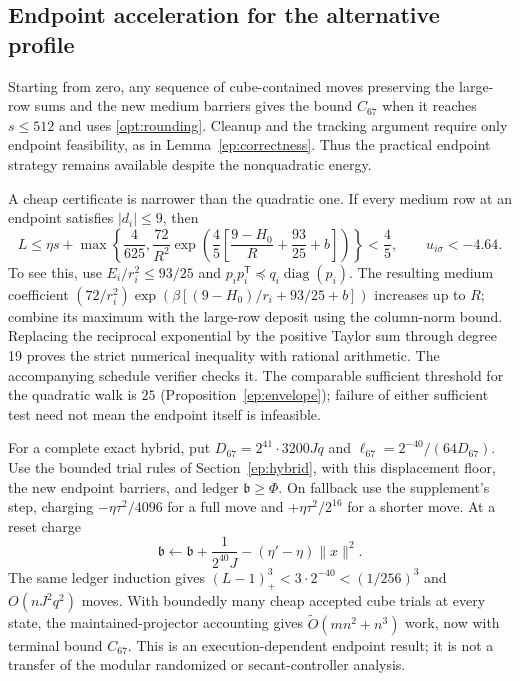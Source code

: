 \documentclass[11pt]{amsart}
\theoremstyle{definition}\newtheorem{definition}[theorem]{Definition}
\theoremstyle{remark}\newtheorem{remark}[theorem]{Remark}
\numberwithin{equation}{section}
\newcommand{\diag}{\operatorname{diag}}
\newcommand{\T}{\mathsf T}
\begin{document}
\subsection{Endpoint acceleration for the alternative profile}
Starting from zero, any sequence of cube-contained moves preserving the
large-row sums and the new medium barriers gives the bound $C_{67}$
when it reaches $s\le512$ and uses \eqref{opt:rounding}. Cleanup and
the tracking argument require only endpoint feasibility, as in
Lemma~\ref{ep:correctness}. Thus the practical endpoint strategy remains
available despite the nonquadratic energy.

A cheap certificate is narrower than the quadratic one. If every medium
row at an endpoint satisfies $|d_i|\le9$, then
\begin{equation}\label{opt:envelope}
 L\le\eta s+\max\left\{\frac4{625},\frac{72}{R^2}
   \exp\!\left(\frac45\left[\frac{9-H_0}{R}+\frac{93}{25}+b\right]\right)\right\}
 <\frac45,
 \qquad u_{i\sigma}<-4.64.
\end{equation}
To see this, use $E_i/r_i^2\le93/25$ and
$p_ip_i^\T\preceq q_i\diag(p_i)$. The resulting medium coefficient
$(72/r_i^2)\exp(\beta[(9-H_0)/r_i+93/25+b])$ increases up to $R$;
combine its maximum with the large-row deposit using the column-norm
bound. Replacing the reciprocal exponential by the positive Taylor
sum through degree 19 proves the strict numerical inequality with
rational arithmetic. The accompanying schedule verifier checks it.
The comparable sufficient threshold for the quadratic walk is $25$
(Proposition~\ref{ep:envelope}); failure of either sufficient test need
not mean the endpoint itself is infeasible.

For a complete exact hybrid, put
$D_{67}=2^{41}\cdot3200Jq$ and
$\ell_{67}=2^{-40}/(64D_{67})$. Use the bounded trial rules of
Section~\ref{ep:hybrid}, with this displacement floor, the new endpoint
barriers, and ledger $\mathfrak b\ge\Phi$. On fallback use the
supplement's step, charging $-\eta\tau^2/4096$ for a full move and
$+\eta\tau^2/2^{16}$ for a shorter move. At a reset charge
\[
 \mathfrak b\leftarrow\mathfrak b+\frac1{2^{40}J}
                 -(\eta'-\eta)\|x\|^2.
\]
The same ledger induction gives
$(L-1)_+^3<3\cdot2^{-40}<(1/256)^3$ and
$O(nJ^2q^2)$ moves. With boundedly many cheap accepted cube trials at
every state, the maintained-projector accounting gives
$\widetilde O(mn^2+n^3)$ work, now with terminal bound $C_{67}$.
This is an execution-dependent endpoint result; it is not a transfer of
the modular randomized or secant-controller analysis.
\end{document}
